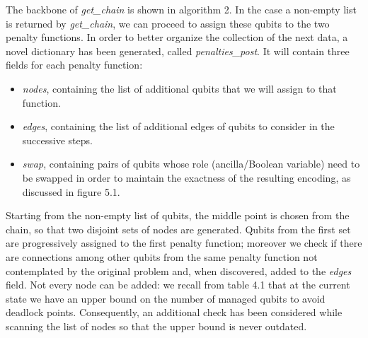The backbone of \textit{get\_chain} is shown in algorithm 2. In the case a non-empty list is returned by \textit{get\_chain}, we can proceed to assign these qubits to the two penalty functions. In order to better organize the collection of the next data, a novel dictionary has been generated, called \textit{penalties\_post}. It will contain three fields for each penalty function:

\begin{itemize}
    \item \textit{nodes}, containing the list of additional qubits that we will assign to that function.
    \item \textit{edges}, containing the list of additional edges of qubits to consider in the successive steps.
    \item \textit{swap}, containing pairs of qubits whose role (ancilla/Boolean variable) need to be swapped in order to maintain the exactness of the resulting encoding, as discussed in figure 5.1.
\end{itemize}

Starting from the non-empty list of qubits, the middle point is chosen from the chain, so that two disjoint sets of nodes are generated. Qubits from the first set are progressively assigned to the first penalty function; moreover we check if there are connections among other qubits from the same penalty function not contemplated by the original problem and, when discovered, added to the \textit{edges} field. Not every node can be added: we recall from table 4.1 that at the current state we have an upper bound on the number of managed qubits to avoid deadlock points. Consequently, an additional check has been considered while scanning the list of nodes so that the upper bound is never outdated. 

